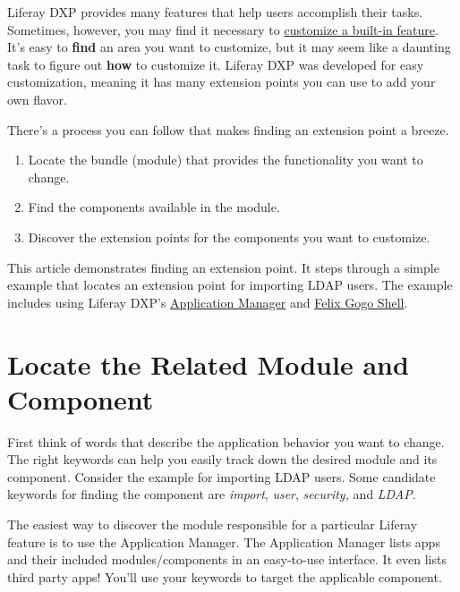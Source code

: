 Liferay DXP provides many features that help users accomplish their
tasks. Sometimes, however, you may find it necessary to
\href{/docs/7-2/customization/-/knowledge_base/c/liferay-customization}{customize
a built-in feature}. It's easy to \textbf{find} an area you want to
customize, but it may seem like a daunting task to figure out
\textbf{how} to customize it. Liferay DXP was developed for easy
customization, meaning it has many extension points you can use to add
your own flavor.

There's a process you can follow that makes finding an extension point a
breeze.

\begin{enumerate}
\def\labelenumi{\arabic{enumi}.}
\tightlist
\item
  Locate the bundle (module) that provides the functionality you want to
  change.
\item
  Find the components available in the module.
\item
  Discover the extension points for the components you want to
  customize.
\end{enumerate}

This article demonstrates finding an extension point. It steps through a
simple example that locates an extension point for importing LDAP users.
The example includes using Liferay DXP's
\href{/docs/7-2/user/-/knowledge_base/u/managing-and-configuring-apps\#using-the-app-manager}{Application
Manager} and
\href{/docs/7-2/customization/-/knowledge_base/c/using-the-felix-gogo-shell}{Felix
Gogo Shell}.

\section{Locate the Related Module and
Component}\label{locate-the-related-module-and-component}

First think of words that describe the application behavior you want to
change. The right keywords can help you easily track down the desired
module and its component. Consider the example for importing LDAP users.
Some candidate keywords for finding the component are \emph{import},
\emph{user}, \emph{security, }and \emph{LDAP}.

The easiest way to discover the module responsible for a particular
Liferay feature is to use the Application Manager. The Application
Manager lists apps and their included modules/components in an
easy-to-use interface. It even lists third party apps! You'll use your
keywords to target the applicable component.

